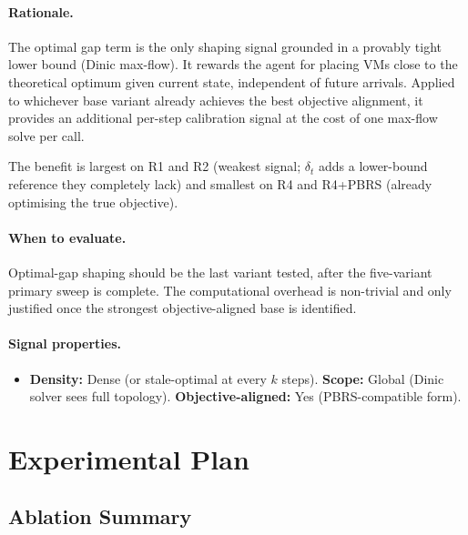 \documentclass[11pt]{article}
\begin{document}
\paragraph{Rationale.}
The optimal gap term is the only shaping signal grounded in a provably
tight lower bound (Dinic max-flow).  It rewards the agent for placing VMs
close to the theoretical optimum given current state, independent of
future arrivals.  Applied to whichever base variant already achieves the
best objective alignment, it provides an additional per-step calibration
signal at the cost of one max-flow solve per call.

The benefit is largest on R1 and R2 (weakest signal; $\delta_t$ adds a
lower-bound reference they completely lack) and smallest on R4 and R4+PBRS
(already optimising the true objective).

\paragraph{When to evaluate.}
Optimal-gap shaping should be the last variant tested, after the
five-variant primary sweep is complete.  The computational overhead is
non-trivial and only justified once the strongest objective-aligned base
is identified.

\paragraph{Signal properties.}
\begin{itemize}
  \item \textbf{Density:} Dense (or stale-optimal at every $k$ steps).
        \quad \textbf{Scope:} Global (Dinic solver sees full topology).
        \quad \textbf{Objective-aligned:} Yes (PBRS-compatible form).
\end{itemize}

\section{Experimental Plan}
\label{sec:experiment}

\subsection{Ablation Summary}
\end{document}
